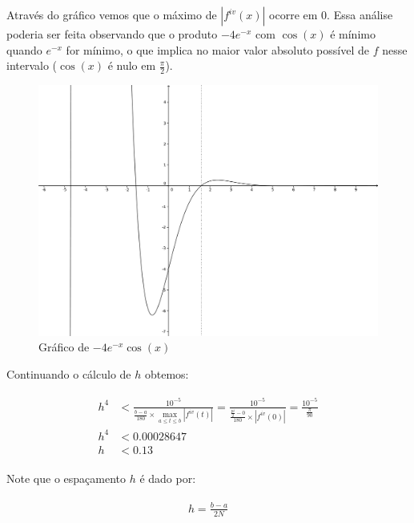 \documentclass[paper=a4, fontsize=12pt]{scrartcl}
\numberwithin{equation}{section} %
\numberwithin{figure}{section} %
\numberwithin{table}{section} %
\newcommand{\euler}{e}
\begin{document}
		Através do gráfico vemos que o máximo de $|f^{iv}(x)|$ ocorre em $0$. Essa análise poderia ser feita observando que o produto $-4\euler^{-x}$ com $\cos(x)$ é mínimo quando $\euler^{-x}$ for mínimo, o que implica no maior valor absoluto possível de $f$ nesse intervalo ($\cos(x)$ é nulo em $\frac{\pi}{2}$).

 		\hspace{1cm}
		\begin{figure}[H]
			\centering
			\includegraphics[scale=0.7]{e-xcos.png}
			\caption{Gráfico de $-4\euler^{-x}\cos(x)$}
		\end{figure}

		Continuando o cálculo de $h$ obtemos:

		\begin{align*}
			\begin{split}
			h^4  	&< \frac{10^{-5}}{\frac{b - a}{180} \times \max_{a \leq t \leq b} |f^{iv}(t)|} =  \frac{10^{-5}}{\frac{\frac{pi}{2} - 0}{180} \times |f^{iv}(0)|} = \frac{10^{-5}}{\frac{\pi}{90}} \\
			h^4		&<	0.00028647\\
			h			&< 0.13
			\end{split}
		\end{align*}

		Note que o espaçamento $h$ é dado por:

		\begin{align*}
			\begin{split}
				h = \frac{b - a}{2N}
			\end{split}
		\end{align*}
\end{document}

